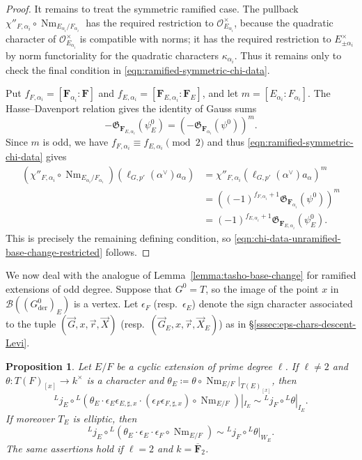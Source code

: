 \documentclass[reqno]{amsart}
\numberwithin{equation}{subsection}
\newcommand{\F}{\mathbf{F}}
\newcommand{\ol}[1]{\overline{#1}}
\newcommand{\co}{\colon}
\newcommand{\ld}{{}^L}
\newcommand\cB{\mathcal{B}}
\newcommand\cO{\mathcal{O}}
\newcommand\frG{\mathfrak{G}}
\DeclareMathOperator{\Nm}{Nm}
\DeclareMathOperator{\der}{der}
\newtheorem{prop}[thm]{Proposition}
\theoremstyle{remark}
\numberwithin{equation}{subsection}
\numberwithin{figure}{subsection}
\begin{document}
\begin{proof}
It remains to treat the symmetric ramified case. The pullback $\chi''_{F,\alpha_i}\circ \Nm_{E_{\alpha_i}/F_{\alpha_i}}$ has the required restriction to $\cO_{E_{\alpha_i}}^\times$, because the quadratic character of $\cO_{E_{\alpha_i}}^\times$ is compatible with norms; it has the required restriction to $E_{\pm\alpha_i}^\times$ by norm functoriality for the quadratic characters $\kappa_{\alpha_i}$.  Thus it remains only to check the final condition in \eqref{eqn:ramified-symmetric-chi-data}.

Put $f_{F,\alpha_i} = [\F_{\alpha_i}:\F]$ and $f_{E,\alpha_i} = [\F_{E,\alpha_i}: \F_E]$, and let $m = [E_{\alpha_i}:F_{\alpha_i}]$. The Hasse--Davenport relation gives the identity of Gauss sums
\[
    -\frG_{\F_{E,\alpha_i}}(\psi_E^0)
    =\left(-\frG_{\F_{\alpha_i}}(\psi^0)\right)^m.
\]
Since $m$ is odd, we have $f_{F,\alpha_i}\equiv f_{E,\alpha_i}\pmod 2$ and thus \eqref{eqn:ramified-symmetric-chi-data} gives
\begin{align*}
    (\chi''_{F,\alpha_i}\circ \Nm_{E_{\alpha_i}/F_{\alpha_i}})
    (\ell_{G,p'}(\alpha^\vee)a_\alpha)
    &=\chi''_{F,\alpha_i}(\ell_{G,p'}(\alpha^\vee)a_\alpha)^m \\
    &= \left((-1)^{f_{F,\alpha_i} +1}\frG_{\F_{\alpha_i}}(\psi^0)\right)^m \\
    &=(-1)^{f_{E,\alpha_i} +1}\frG_{\F_{E,\alpha_i}}(\psi_E^0).
\end{align*}
This is precisely the remaining defining condition, so \eqref{eqn:chi-data-unramified-base-change-restricted} follows.
\end{proof}

We now deal with the analogue of Lemma~\ref{lemma:tasho-base-change} for ramified extensions of odd degree. Suppose that $G^0 = T$, so the image of the point $x$ in $\cB((G^0_{\der})_E)$ is a vertex. Let $\epsilon_F$ (resp.\ $\epsilon_E$) denote the sign character associated to the tuple $(\vec G, x, \vec r, \vec X)$ (resp.\ $(\vec G_E, x, \vec r, \vec X_E)$) as in \S\ref{sssec:eps-chars-descent-Levi}.

\begin{prop}\label{prop:ramified-kal-bc}
Let $E/F$ be a cyclic extension of prime degree $\ell$. If $\ell \neq 2$ and $\theta\co T(F)_{[x]} \to k^\times$ is a character and $\theta_E \coloneqq \theta \circ \Nm_{E/F}|_{T(E)_{[x]}}$, then
\[
    \ld j_E \circ \ld(\theta_E\cdot\epsilon_E\epsilon_{E,\sharp,x}\cdot (\epsilon_F\epsilon_{F,\sharp,x}) \circ \Nm_{E/F})|_{I_E} \sim \ld j_F \circ \ld\theta|_{I_E}.
\]
If moreover $T_E$ is elliptic, then
\[
    \ld j_E \circ \ld(\theta_E\cdot\epsilon_E\cdot \epsilon_F \circ \Nm_{E/F}) \sim \ld j_F \circ \ld\theta|_{W_E}.
\]
The same assertions hold if $\ell = 2$ and $k = \ol \F_2$.
\end{prop}
\end{document}
